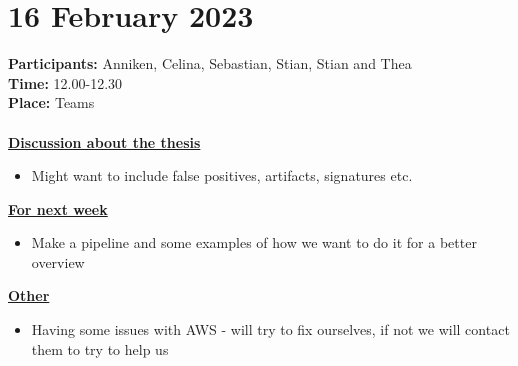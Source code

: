 \section{16 February 2023}
\textbf{Participants:} Anniken, Celina, Sebastian, Stian, Stian and Thea\\
\textbf{Time:} 12.00-12.30 \\
\textbf{Place:} Teams
\\~\\
\textbf{\underline{Discussion about the thesis}}
\begin{itemize}
    \item Might want to include false positives, artifacts, signatures etc.
\end{itemize}

\textbf{\underline{For next week}}
\begin{itemize}
    \item Make a pipeline and some examples of how we want to do it for a better overview
\end{itemize}

\textbf{\underline{Other}}
\begin{itemize}
    \item Having some issues with AWS - will try to fix ourselves, if not we will contact them to try to help us
\end{itemize}

